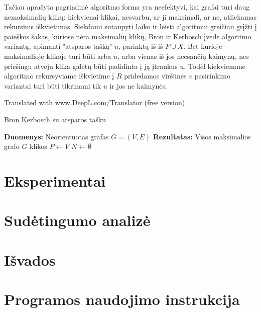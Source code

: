 \documentclass{VUMIFInfKursinis}
\begin{document}
Tačiau aprašyta pagrindinė algoritmo forma yra neefektyvi, kai grafai turi daug nemaksimalių klikų: kiekvienai klikai, nesvarbu, ar ji maksimali, ar ne, atliekamas rekursinis iškvietimas. Siekdami sutaupyti laiko ir leisti algoritmui greičiau grįžti į paieškos šakas, kuriose nėra maksimalių klikų, Bron ir Kerbosch įvedė algoritmo variantą, apimantį "atsparos tašką" $u$, parinktą iš iš $P \cup X$. Bet kurioje maksimalioje klikoje turi būti arba $u$, arba vienas iš jos neesančių kaimynų, nes priešingu atveju klika galėtų būti padidinta į ją įtraukus $u$. Todėl kiekviename algoritmo rekursyviame iškvietime į $R$ pridedamos viršūnės $v$ pasirinkimo variantai turi būti tikrinami tik $u$ ir jos ne kaimynės.

Translated with www.DeepL.com/Translator (free version)

\begin{algorithm}[H]
  \DontPrintSemicolon
  \caption{Bron Kerbosch su atsparos tašku}
  \textbf{Duomenys:} Neorientuotas grafas $G=(V,E)$ \;
  \textbf{Rezultatas:} Visos maksimalios grafo $G$ klikos \;
  $P \gets V$ \;
  $N \gets \emptyset$ \;
\end{algorithm}

\section{Eksperimentai}

\section{Sudėtingumo analizė}

\section{Išvados}

\section{Programos naudojimo instrukcija}

\printbibliography[heading=bibintoc] %

\end{document}
